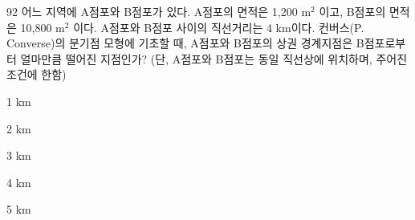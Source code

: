 \begin{question}{92}
어느 지역에 A점포와 B점포가 있다. A점포의 면적은 1,200 $\mathrm{m}^{2}$ 이고, B점포의 면적은 10,800 $\mathrm{m}^{2}$ 이다. A점포와 B점포 사이의 직선거리는 4 km이다. 컨버스(P. Converse)의 분기점 모형에 기초할 때, A점포와 B점포의 상권 경계지점은 B점포로부터 얼마만큼 떨어진 지점인가? (단, A점포와 B점포는 동일 직선상에 위치하며, 주어진 조건에 한함)
\begin{choices}
  \item 1 km
  \item 2 km
  \item 3 km
  \item 4 km
  \item 5 km
\end{choices}
\end{question}
